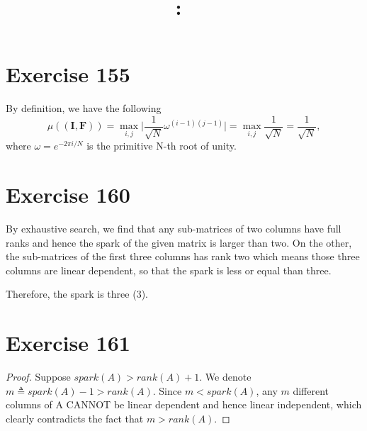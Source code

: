 \documentclass{article}
\date{}
\title{
    \textmd{\textbf{\hmwkClass:\ \hmwkTitle}}\\
}
\author{\hmwkAuthorName}
\begin{document}
\maketitle
\section{Exercise 155}
By definition, we have the following
$$
\mu((\mathbf I,\mathbf F)) = \max_{i,j} \vert \frac{1}{\sqrt{N}} \omega^{(i-1)(j-1)} \vert = \max_{i,j} \frac{1}{\sqrt{N}} = \frac{1}{\sqrt{N}},
$$
where $\omega = e^{-2\pi i/N}$ is the primitive N-th root of unity.

\section{Exercise 160}
By exhaustive search, we find that any sub-matrices of two columns have full ranks and hence the spark of the given matrix is larger than two. On the other, the sub-matrices of the first three columns has rank two which means those three columns are linear dependent, so that the spark is less or equal than three.

Therefore, the spark is three (3).

\section{Exercise 161}
\begin{proof}
Suppose $spark(A) > rank(A) + 1$. We denote $m \triangleq spark(A) - 1 > rank(A)$. Since $m < spark(A)$, any $m$ different columns of A CANNOT be linear dependent and hence linear independent, which clearly contradicts the fact that $m > rank(A)$.
\end{proof}
\end{document}
